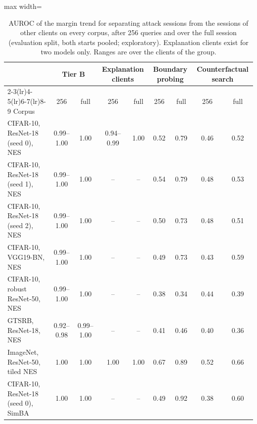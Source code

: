 \begin{table}[!tbp]
\centering\footnotesize\setlength{\tabcolsep}{4pt}
\caption{AUROC of the margin trend for separating attack sessions from the sessions of other clients on every corpus, after 256 queries and over the full session (evaluation split, both starts pooled; exploratory). Explanation clients exist for two models only. Ranges are over the clients of the group.}
\label{tab:outputstatsall}
\vspace{3pt}
\begin{adjustbox}{max width=\textwidth}
\begin{tabular}{lcccccccc}
\toprule
& \multicolumn{2}{c}{Tier B} & \multicolumn{2}{c}{Explanation clients} & \multicolumn{2}{c}{Boundary probing} & \multicolumn{2}{c}{Counterfactual search} \\
\cmidrule(lr){2-3}\cmidrule(lr){4-5}\cmidrule(lr){6-7}\cmidrule(lr){8-9}
Corpus & 256 & full & 256 & full & 256 & full & 256 & full \\
\midrule
CIFAR-10, ResNet-18 (seed 0), NES & 0.99--1.00 & 1.00 & 0.94--0.99 & 1.00 & 0.52 & 0.79 & 0.46 & 0.52 \\
CIFAR-10, ResNet-18 (seed 1), NES & 0.99--1.00 & 1.00 & -- & -- & 0.54 & 0.79 & 0.48 & 0.53 \\
CIFAR-10, ResNet-18 (seed 2), NES & 0.99--1.00 & 1.00 & -- & -- & 0.50 & 0.73 & 0.48 & 0.51 \\
CIFAR-10, VGG19-BN, NES & 0.99--1.00 & 1.00 & -- & -- & 0.49 & 0.73 & 0.43 & 0.59 \\
CIFAR-10, robust ResNet-50, NES & 0.99--1.00 & 1.00 & -- & -- & 0.38 & 0.34 & 0.44 & 0.39 \\
GTSRB, ResNet-18, NES & 0.92--0.98 & 0.99--1.00 & -- & -- & 0.41 & 0.46 & 0.40 & 0.36 \\
ImageNet, ResNet-50, tiled NES & 1.00 & 1.00 & 1.00 & 1.00 & 0.67 & 0.89 & 0.52 & 0.66 \\
CIFAR-10, ResNet-18 (seed 0), SimBA & 1.00 & 1.00 & -- & -- & 0.49 & 0.92 & 0.38 & 0.60 \\
\bottomrule
\end{tabular}
\end{adjustbox}
\end{table}

